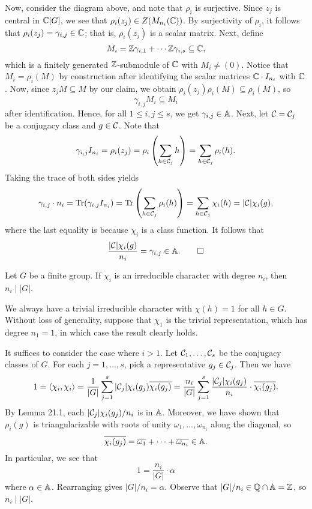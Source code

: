 \begin{pf}
    Now, consider the diagram above, and note that $\rho_i$ is surjective. Since 
    $z_j$ is central in $\mathbb{C}[G]$, we see that $\rho_i(z_j) \in Z(M_{n_i}(\mathbb{C}))$. 
    By surjectivity of $\rho_i$, it follows that $\rho_i(z_j) = 
    \gamma_{i,j} \in \mathbb{C}$; that is, $\rho_i(z_j)$ is a scalar matrix. Next, 
    define 
    \[ M_i = \mathbb{Z}\gamma_{i,1} + \cdots \mathbb{Z}\gamma_{i,s} \subseteq \mathbb{C}, \] 
    which is a finitely generated $\mathbb{Z}$-submodule of $\mathbb{C}$ with $M_i \neq (0)$. 
    Notice that $M_i = \rho_i(M)$ by construction after identifying the 
    scalar matrices $\mathbb{C} \cdot I_{n_i}$ with $\mathbb{C}$. Now, since $z_j M \subseteq M$ 
    by our claim, we obtain $\rho_i(z_j) \rho_i(M) \subseteq \rho_i(M)$, so 
    \[ \gamma_{i,j} M_i \subseteq M_i \] 
    after identification. Hence, for all $1 \leq i, j \leq s$, we get 
    $\gamma_{i,j} \in \mathbb{A}$. Next, let ${\cal C} = {\cal C}_j$ be a conjugacy class 
    and $g \in {\cal C}$. Note that 
    \[ \gamma_{i,j} I_{n_i} = \rho_i(z_j) = \rho_i \left( \sum_{h \in {\cal C}_j} h 
    \right) = \sum_{h \in {\cal C}_j} \rho_i(h). \] 
    Taking the trace of both sides yields 
    \[ \gamma_{i,j} \cdot n_i = \operatorname{Tr}(\gamma_{i,j} I_{n_i}) = 
    \operatorname{Tr}\left( \sum_{h\in {\cal C}_j} \rho_i(h) \right) = \sum_{h \in {\cal C}_j} 
    \chi_i(h) = |{\cal C}| \chi_i(g), \] 
    where the last equality is because $\chi_i$ is a class function. It follows that 
    \[ \frac{|{\cal C}| \chi_i(g)}{n_i} = \gamma_{i,j} \in \mathbb{A}. \qedhere \] 
\end{pf}

\begin{theo}{}
    Let $G$ be a finite group. If $\chi_i$ is an irreducible character with 
    degree $n_i$, then $n_i \mid |G|$. 
\end{theo}
\begin{pf}
    We always have a trivial irreducible character with $\chi(h) = 1$ for all 
    $h \in G$. Without loss of generality, suppose that $\chi_1$ is the trivial 
    representation, which has degree $n_1 = 1$, in which case the result 
    clearly holds. 

    It suffices to consider the case where $i > 1$. Let ${\cal C}_1, \dots, 
    {\cal C}_s$ be the conjugacy classes of $G$. For each $j = 1, \dots, 
    s$, pick a representative $g_j \in {\cal C}_j$. Then we have 
    \[ 1 = \langle \chi_i, \chi_i \rangle = 
    \frac1{|G|} \sum_{j=1}^s |{\cal C}_j| \chi_i(g_j) \overline{\chi_i(g_j)} = 
    \frac{n_i}{|G|} \sum_{j=1}^s \frac{|{\cal C}_j| \chi_i(g_j)}{n_i} 
    \cdot \overline{\chi_i(g_j)}. \] 
    By Lemma 21.1, each $|{\cal C}_j|\chi_i(g_j)/n_i$ is in $\mathbb{A}$. Moreover, 
    we have shown that $\rho_i(g)$ is triangularizable with roots of 
    unity $\omega_1, \dots, \omega_{n_i}$ along the diagonal, so 
    \[ \overline{\chi_i(g_j)} = \overline{\omega_1} + \cdots + \overline{\omega_{n_i}} 
    \in \mathbb{A}. \] 
    In particular, we see that 
    \[ 1 = \frac{n_i}{|G|} \cdot \alpha \] 
    where $\alpha \in \mathbb{A}$. Rearranging gives $|G|/n_i = \alpha$. Observe that 
    $|G|/n_i \in \mathbb{Q} \cap \mathbb{A} = \mathbb{Z}$, so $n_i \mid |G|$. 
\end{pf}